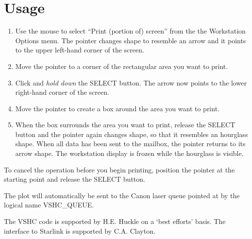 \section{Usage}

\begin{enumerate}

\item Use the mouse to select ``Print (portion of) screen'' from the
the Workstation Options menu. The pointer changes shape to resemble an
arrow and it points to the upper left-hand corner of the screen.

\item Move the pointer to a corner of the rectangular area you want to
print.

\item Click and {\it hold down} the SELECT button. The arrow now points to the
lower right-hand corner of the screen.

\item Move the pointer to create a box around the area you want to print.

\item When the box surrounds the area you want to print, release the  SELECT
button and the pointer again changes shape, so that it resembles an hourglass
shape. When all data has been sent to the mailbox, the pointer returns to its
arrow shape. The workstation display is frozen while the hourglass is visible.

\end{enumerate}

To cancel the operation before you begin printing, position the pointer at
the starting point and release the SELECT button.

The plot will automatically be sent to the Canon laser queue pointed at by
the logical name VSHC\_QUEUE.

The VSHC code is supported by H.E. Huckle on a `best efforts' basis. The
interface to Starlink is supported by C.A. Clayton.


